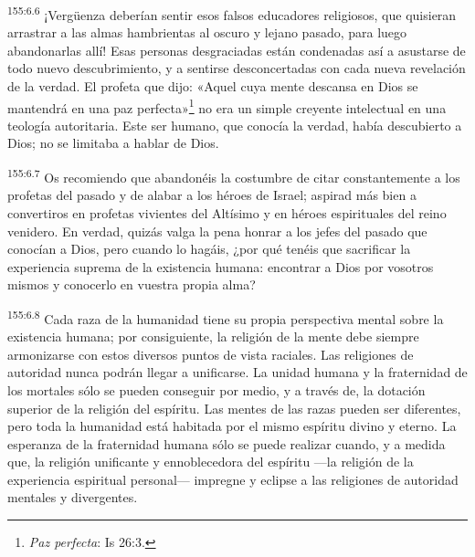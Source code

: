 \par
\textsuperscript{155:6.6} ¡Verg\"uenza deberían sentir esos falsos educadores religiosos, que quisieran arrastrar a las almas hambrientas al oscuro y lejano pasado, para luego abandonarlas allí! Esas personas desgraciadas están condenadas así a asustarse de todo nuevo descubrimiento, y a sentirse desconcertadas con cada nueva revelación de la verdad. El profeta que dijo: «Aquel cuya mente descansa en Dios se mantendrá en una paz perfecta»\footnote{\textit{Paz perfecta}: Is 26:3.} no era un simple creyente intelectual en una teología autoritaria. Este ser humano, que conocía la verdad, había descubierto a Dios; no se limitaba a hablar de Dios.

\par
\textsuperscript{155:6.7} Os recomiendo que abandonéis la costumbre de citar constantemente a los profetas del pasado y de alabar a los héroes de Israel; aspirad más bien a convertiros en profetas vivientes del Altísimo y en héroes espirituales del reino venidero. En verdad, quizás valga la pena honrar a los jefes del pasado que conocían a Dios, pero cuando lo hagáis, ¿por qué tenéis que sacrificar la experiencia suprema de la existencia humana: encontrar a Dios por vosotros mismos y conocerlo en vuestra propia alma?

\par
\textsuperscript{155:6.8} Cada raza de la humanidad tiene su propia perspectiva mental sobre la existencia humana; por consiguiente, la religión de la mente debe siempre armonizarse con estos diversos puntos de vista raciales. Las religiones de autoridad nunca podrán llegar a unificarse. La unidad humana y la fraternidad de los mortales sólo se pueden conseguir por medio, y a través de, la dotación superior de la religión del espíritu. Las mentes de las razas pueden ser diferentes, pero toda la humanidad está habitada por el mismo espíritu divino y eterno. La esperanza de la fraternidad humana sólo se puede realizar cuando, y a medida que, la religión unificante y ennoblecedora del espíritu ---la religión de la experiencia espiritual personal--- impregne y eclipse a las religiones de autoridad mentales y divergentes.

